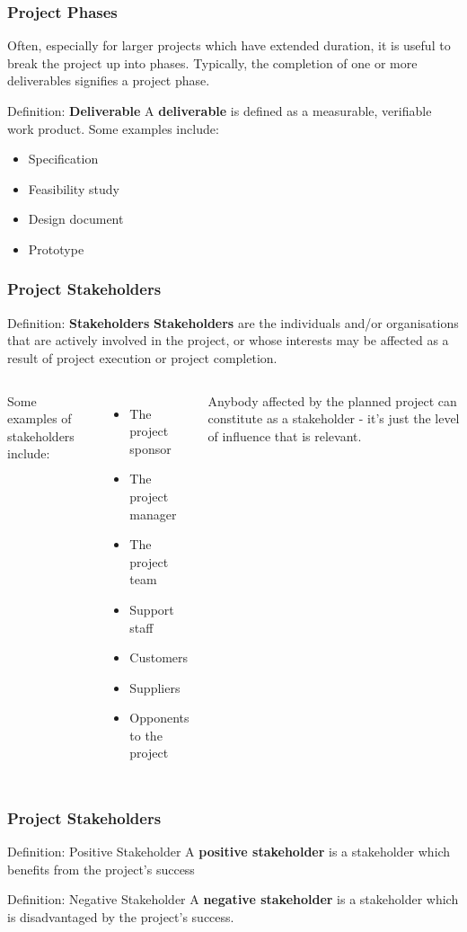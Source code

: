 \documentclass{beamer}
\begin{document}
\begin{frame}
\frametitle{Project Phases}
Often, especially for larger projects which have extended duration, it is useful to break the project up into phases. Typically, the completion of one or more deliverables signifies a project phase.
\vspace{0.5cm}
\begin{block}{Definition: \textbf{Deliverable}}
A \textbf{deliverable} is defined as a measurable, verifiable work product. Some examples include:
\begin{itemize}
\item Specification
\item Feasibility study
\item Design document
\item Prototype
\end{itemize}
\end{block}
\end{frame}

\begin{frame}
\frametitle{Project Stakeholders}
\begin{block}{Definition: \textbf{Stakeholders}}
\textbf{Stakeholders} are the individuals and/or organisations that are actively involved in the project, or whose interests may be affected as a result of project execution or project completion.
\end{block}
\vspace{0.5cm}
\begin{columns}
Some examples of stakeholders include:
\begin{itemize}
\item The project sponsor
\item The project manager
\item The project team
\item Support staff
\item Customers
\item Suppliers
\item Opponents to the project
\end{itemize}
Anybody affected by the planned project can constitute as a stakeholder - it's just the level of influence that is relevant.
\end{columns}
\end{frame}

\begin{frame}
\frametitle{Project Stakeholders}
\begin{block}{Definition: Positive Stakeholder}
A \textbf{positive stakeholder} is a stakeholder which benefits from the project's success
\end{block}
\vspace{0.5cm}
\begin{block}{Definition: Negative Stakeholder}
A \textbf{negative stakeholder} is a stakeholder which is disadvantaged by the project's success.
\end{block}
\end{frame}
\end{document}
